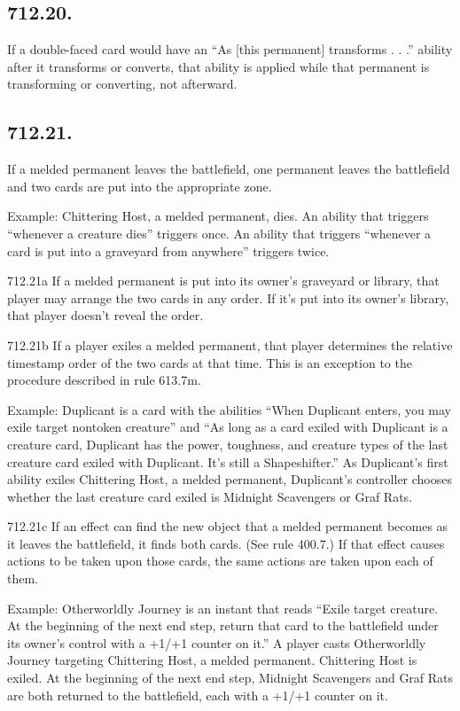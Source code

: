 \subsection*{712.20.}
If a double-faced card would have an “As [this permanent] transforms . . .” ability after it transforms or converts, that ability is applied while that permanent is transforming or converting, not afterward.

\subsection*{712.21.}
If a melded permanent leaves the battlefield, one permanent leaves the battlefield and two cards are put into the appropriate zone.

Example: Chittering Host, a melded permanent, dies. An ability that triggers “whenever a creature dies” triggers once. An ability that triggers “whenever a card is put into a graveyard from anywhere” triggers twice.

712.21a If a melded permanent is put into its owner’s graveyard or library, that player may arrange the two cards in any order. If it’s put into its owner’s library, that player doesn’t reveal the order.

712.21b If a player exiles a melded permanent, that player determines the relative timestamp order of the two cards at that time. This is an exception to the procedure described in rule 613.7m.

Example: Duplicant is a card with the abilities “When Duplicant enters, you may exile target nontoken creature” and “As long as a card exiled with Duplicant is a creature card, Duplicant has the power, toughness, and creature types of the last creature card exiled with Duplicant. It’s still a Shapeshifter.” As Duplicant’s first ability exiles Chittering Host, a melded permanent, Duplicant’s controller chooses whether the last creature card exiled is Midnight Scavengers or Graf Rats.

712.21c If an effect can find the new object that a melded permanent becomes as it leaves the battlefield, it finds both cards. (See rule 400.7.) If that effect causes actions to be taken upon those cards, the same actions are taken upon each of them.

Example: Otherworldly Journey is an instant that reads “Exile target creature. At the beginning of the next end step, return that card to the battlefield under its owner’s control with a +1/+1 counter on it.” A player casts Otherworldly Journey targeting Chittering Host, a melded permanent. Chittering Host is exiled. At the beginning of the next end step, Midnight Scavengers and Graf Rats are both returned to the battlefield, each with a +1/+1 counter on it.

